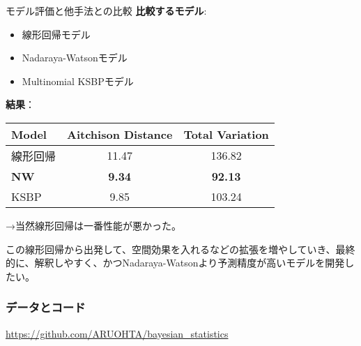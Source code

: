 \documentclass[xelatex, 8pt]{beamer}
\theoremstyle{plain}
\theoremstyle{definition}
\begin{document}
\begin{frame}{モデル評価と他手法との比較}
   \textbf{比較するモデル}:
    \begin{itemize}
        \item 線形回帰モデル
        \item Nadaraya-Watsonモデル
        \item Multinomial KSBPモデル
    \end{itemize}

    \vspace{5mm}

    \textbf{結果}：
    \begin{table}
        \centering
        \begin{tabular}{l|cc}
            \hline
            Model & Aitchison Distance & Total Variation \\
            \hline
            線形回帰 & 11.47 & 136.82 \\
            \textbf{NW} & \textbf{9.34} & \textbf{92.13} \\
            KSBP & 9.85 & 103.24 \\
            \hline
        \end{tabular}
    \end{table}

    \vspace{3mm}
    →当然線形回帰は一番性能が悪かった。

    \vspace{3mm}
    この線形回帰から出発して、空間効果を入れるなどの拡張を増やしていき、最終的に、解釈しやすく、かつNadaraya-Watsonより予測精度が高いモデルを開発したい。

\end{frame}

\begin{frame}
\frametitle{データとコード}

\url{https://github.com/ARUOHTA/bayesian_statistics}

\end{frame}


\end{document}
